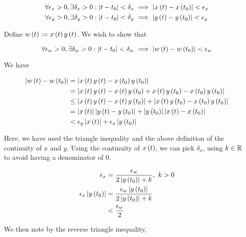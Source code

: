 \documentclass{article}
\begin{document}
\begin{align*}
    \forall \epsilon_{x} > 0, \exists \delta_{x} > 0 &: \left\lvert t - t_0 \right\rvert < \delta_{x} \implies \left\lvert  x \left ( t \right) - x \left ( t_0 \right) \right\rvert < \epsilon_x \\
  \forall \epsilon_{y} > 0, \exists \delta_{y} > 0 &: \left\lvert t - t_0 \right\rvert < \delta_{y} \implies \left\lvert y \left ( t \right) - y \left ( t_0 \right) \right\rvert < \epsilon_y \\
\end{align*}

Define $w \left ( t \right) := x \left ( t \right) y \left ( t \right)$.
We wish to show that

$$
\forall \epsilon_{w} > 0, \exists \delta_{w} > 0 : \left\lvert t - t_0 \right\rvert < \delta_{w} \implies \left\lvert  w \left ( t \right) - w \left ( t_0 \right) \right\rvert < \epsilon_w
$$

We have

\begin{align*}
  \left\lvert w \left ( t \right) - w \left ( t_0 \right) \right\rvert & = \left\lvert x \left ( t \right) y \left ( t \right) - x \left ( t_0 \right) y \left ( t_0 \right) \right\rvert \\
                                  & = \left\lvert x \left ( t \right) y \left ( t \right) - x \left ( t \right) y \left ( t_0 \right) + x \left ( t \right) y \left ( t_0 \right) - x \left ( t_0 \right) y \left ( t_0 \right) \right\rvert \\
                                  & \leq \left\lvert x \left ( t \right) y \left ( t \right) - x \left ( t \right) y \left ( t_0 \right) \right\rvert + \left\lvert x \left ( t \right) y \left ( t_0 \right) - x \left ( t_0 \right) y \left ( t_0 \right) \right\rvert \\
                                  & = \left\lvert x \left ( t \right) \right\rvert \left\lvert y \left ( t \right) - y \left ( t_0 \right) \right\rvert + \left\lvert y \left ( t_0 \right) \right\rvert \left\lvert x \left ( t \right) - x \left ( t_0 \right) \right\rvert \\
                                  & < \epsilon_y \left\lvert x \left ( t \right) \right\rvert + \epsilon_x \left\lvert y \left ( t_0 \right) \right\rvert \\
\end{align*}

Here, we have used the triangle inequality and the above definition of the continuity of $x$ and $y$.
Using the continuity of $x \left ( t \right)$, we can pick $\delta_x$, using $k \in \mathbb R$ to avoid having a denominator of 0.

\begin{align*}
  \epsilon_x &= \frac{\epsilon_w}{2 \left\lvert y \left ( t_0 \right) \right\rvert + k},\ k > 0 \\
  \epsilon_x \left\lvert y \left ( t_0 \right) \right\rvert &= \frac{\epsilon_w \left\lvert y \left ( t_0 \right) \right\rvert}{2 \left\lvert y \left ( t_0 \right) \right\rvert + k} \\
  & < \frac{\epsilon_w}{2} \\
\end{align*}

We then note by the reverse triangle inequality,
\end{document}
